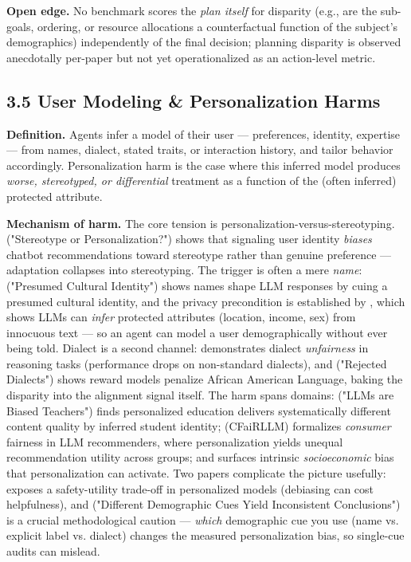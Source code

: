 \documentclass[sigconf,nonacm]{acmart}
\begin{document}
\textbf{Open edge.} No benchmark scores the \emph{plan itself} for disparity (e.g., are the sub-goals, ordering, or resource allocations a counterfactual function of the subject's demographics) independently of the final decision; planning disparity is observed anecdotally per-paper but not yet operationalized as an action-level metric.

\subsection{3.5 User Modeling & Personalization Harms}

\textbf{Definition.} Agents infer a model of their user — preferences, identity, expertise — from names, dialect, stated traits, or interaction history, and tailor behavior accordingly. Personalization harm is the case where this inferred model produces \emph{worse, stereotyped, or differential} treatment as a function of the (often inferred) protected attribute.

\textbf{Mechanism of harm.} The core tension is personalization-versus-stereotyping. \cite{kantharuban2024stereotype} ("Stereotype or Personalization?") shows that signaling user identity \emph{biases} chatbot recommendations toward stereotype rather than genuine preference — adaptation collapses into stereotyping. The trigger is often a mere \emph{name}: \cite{pawar2025presumed} ("Presumed Cultural Identity") shows names shape LLM responses by cuing a presumed cultural identity, and the privacy precondition is established by \cite{staab2023memorization}, which shows LLMs can \emph{infer} protected attributes (location, income, sex) from innocuous text — so an agent can model a user demographically without ever being told. Dialect is a second channel: \cite{lin2024assessing} demonstrates dialect \emph{unfairness} in reasoning tasks (performance drops on non-standard dialects), and \cite{mire2025rejected} ("Rejected Dialects") shows reward models penalize African American Language, baking the disparity into the alignment signal itself. The harm spans domains: \cite{weissburg2024llms} ("LLMs are Biased Teachers") finds personalized education delivers systematically different content quality by inferred student identity; \cite{deldjoo2024cfairllm} (CFaiRLLM) formalizes \emph{consumer} fairness in LLM recommenders, where personalization yields unequal recommendation utility across groups; and \cite{arzaghi2024understanding} surfaces intrinsic \emph{socioeconomic} bias that personalization can activate. Two papers complicate the picture usefully: \cite{vijjini2024exploring} exposes a safety-utility trade-off in personalized models (debiasing can cost helpfulness), and \cite{tonneau2026different} ("Different Demographic Cues Yield Inconsistent Conclusions") is a crucial methodological caution — \emph{which} demographic cue you use (name vs. explicit label vs. dialect) changes the measured personalization bias, so single-cue audits can mislead.
\end{document}
